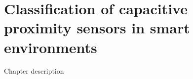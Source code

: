 \chapter{Classification of capacitive proximity sensors in smart environments}
Chapter description


